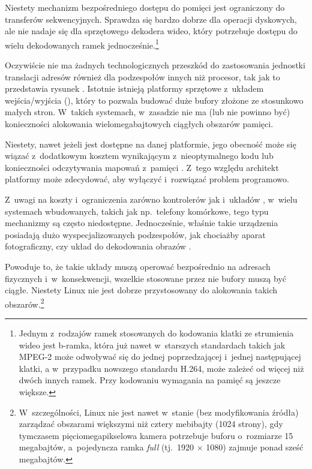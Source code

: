 Niestety mechanizm bezpośredniego dostępu do pomięci jest ograniczony
do transferów sekwencyjnych.  Sprawdza się bardzo dobrze dla operacji
dyskowych, ale nie nadaje się dla sprzętowego dekodera wideo, który
potrzebuje dostępu do wielu dekodowanych ramek
jednocześnie.\footnote{Jednym z~rodzajów ramek stosowanych do
  kodowania klatki ze strumienia wideo jest b-ramka, która już nawet
  w~starszych standardach takich jak MPEG-2 może odwoływać się do
  jednej poprzedzającej i~jednej następującej klatki, a w~przypadku
  nowszego standardu H.264, może zależeć od więcej niż dwóch innych
  ramek.  Przy kodowaniu wymagania na pamięć są jeszcze większe.}

Oczywiście nie ma żadnych technologicznych przeszkód do zastosowania
jednostki translacji adresów również dla podzespołów innych niż
procesor, tak jak to przedstawia rysunek .
Istotnie istnieją platformy sprzętowe z~układem 
wejścia/wyjścia (), który to pozwala budować duże bufory
złożone ze stosunkowo małych stron.  W~takich systemach, w~zasadzie
nie ma (lub nie powinno być) konieczności alokowania
wielomegabajtowych ciągłych obszarów pamięci.

Niestety, nawet jeżeli  jest dostępne na danej platformie, jego
obecność może się wiązać z~dodatkowym kosztem wynikającym
z~nieoptymalnego kodu \autocite{bib:price-of-safety} lub konieczności
odczytywania mapowań z~pamięci
\autocite{bib:mitigate-iotlb-bottleneck}.  Z~tego względu architekt
platformy może zdecydować, aby wyłączyć  i~rozwiązać problem
programowo.

Z~uwagi na koszty i~ograniczenia zarówno kontrolerów  jak
i~układów , w~wielu systemach wbudowanych, takich jak
np.\ telefony komórkowe, tego typu mechanizmy są często niedostępne.
Jednocześnie, właśnie takie urządzenia posiadają dużo
wyspecjalizowanych podzespołów, jak chociażby aparat fotograficzny,
czy układ do dekodowania obrazów .

Powoduje to, że takie układy muszą operować bezpośrednio na adresach
fizycznych i~w~konsekwencji, wszelkie stosowane przez nie bufory muszą
być ciągłe.  Niestety Linux nie jest dobrze przystosowany do
alokowania takich obszarów.\footnote{W~szczególności, Linux nie jest
  nawet w~stanie (bez modyfikowania źródła) zarządzać obszarami
  większymi niż cztery mebibajty (1024 strony), gdy tymczasem
  pięciomegapikselowa kamera potrzebuje buforu o~rozmiarze 15
  megabajtów, a~pojedyncza ramka \textit{full } (tj.\ 1920
  $\times$ 1080) zajmuje ponad sześć megabajtów.}


